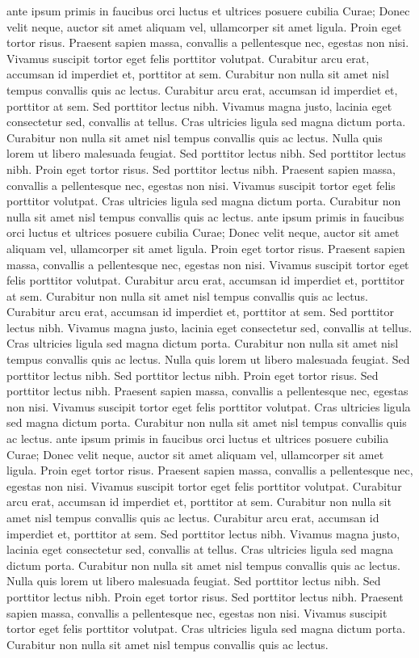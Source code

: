 \documentclass{article}
\begin{document}
ante ipsum primis in faucibus orci luctus et ultrices posuere cubilia Curae; Donec velit neque, auctor sit amet aliquam vel, ullamcorper sit amet ligula. Proin eget tortor risus. Praesent sapien massa, convallis a pellentesque nec, egestas non nisi. Vivamus suscipit tortor eget felis porttitor volutpat. Curabitur arcu erat, accumsan id imperdiet et, porttitor at sem. Curabitur non nulla sit amet nisl tempus convallis quis ac lectus. Curabitur arcu erat, accumsan id imperdiet et, porttitor at sem. Sed porttitor lectus nibh. Vivamus magna justo, lacinia eget consectetur sed, convallis at tellus. Cras ultricies ligula sed magna dictum porta. Curabitur non nulla sit amet nisl tempus convallis quis ac lectus. Nulla quis lorem ut libero malesuada feugiat. Sed porttitor lectus nibh. Sed porttitor lectus nibh. Proin eget tortor risus. Sed porttitor lectus nibh. Praesent sapien massa, convallis a pellentesque nec, egestas non nisi. Vivamus suscipit tortor eget felis porttitor volutpat. Cras ultricies ligula sed magna dictum porta. Curabitur non nulla sit amet nisl tempus convallis quis ac lectus.
ante ipsum primis in faucibus orci luctus et ultrices posuere cubilia Curae; Donec velit neque, auctor sit amet aliquam vel, ullamcorper sit amet ligula. Proin eget tortor risus. Praesent sapien massa, convallis a pellentesque nec, egestas non nisi. Vivamus suscipit tortor eget felis porttitor volutpat. Curabitur arcu erat, accumsan id imperdiet et, porttitor at sem. Curabitur non nulla sit amet nisl tempus convallis quis ac lectus. Curabitur arcu erat, accumsan id imperdiet et, porttitor at sem. Sed porttitor lectus nibh. Vivamus magna justo, lacinia eget consectetur sed, convallis at tellus. Cras ultricies ligula sed magna dictum porta. Curabitur non nulla sit amet nisl tempus convallis quis ac lectus. Nulla quis lorem ut libero malesuada feugiat. Sed porttitor lectus nibh. Sed porttitor lectus nibh. Proin eget tortor risus. Sed porttitor lectus nibh. Praesent sapien massa, convallis a pellentesque nec, egestas non nisi. Vivamus suscipit tortor eget felis porttitor volutpat. Cras ultricies ligula sed magna dictum porta. Curabitur non nulla sit amet nisl tempus convallis quis ac lectus.
ante ipsum primis in faucibus orci luctus et ultrices posuere cubilia Curae; Donec velit neque, auctor sit amet aliquam vel, ullamcorper sit amet ligula. Proin eget tortor risus. Praesent sapien massa, convallis a pellentesque nec, egestas non nisi. Vivamus suscipit tortor eget felis porttitor volutpat. Curabitur arcu erat, accumsan id imperdiet et, porttitor at sem. Curabitur non nulla sit amet nisl tempus convallis quis ac lectus. Curabitur arcu erat, accumsan id imperdiet et, porttitor at sem. Sed porttitor lectus nibh. Vivamus magna justo, lacinia eget consectetur sed, convallis at tellus. Cras ultricies ligula sed magna dictum porta. Curabitur non nulla sit amet nisl tempus convallis quis ac lectus. Nulla quis lorem ut libero malesuada feugiat. Sed porttitor lectus nibh. Sed porttitor lectus nibh. Proin eget tortor risus. Sed porttitor lectus nibh. Praesent sapien massa, convallis a pellentesque nec, egestas non nisi. Vivamus suscipit tortor eget felis porttitor volutpat. Cras ultricies ligula sed magna dictum porta. Curabitur non nulla sit amet nisl tempus convallis quis ac lectus.
\end{document}
